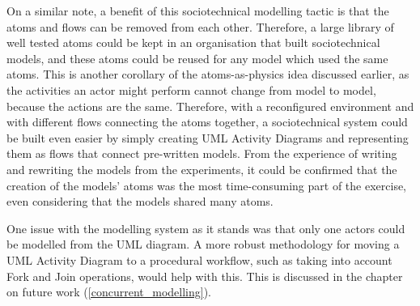 On a similar note, a benefit of this sociotechnical modelling tactic is that the atoms and flows can be removed from each other. Therefore, a large library of well tested atoms could be kept in an organisation that built sociotechnical models, and these atoms could be reused for any model which used the same atoms. This is another corollary of the atoms-as-physics idea discussed earlier, as the activities an actor might perform cannot change from model to model, because the actions are the same. Therefore, with a reconfigured environment and with different flows connecting the atoms together, a sociotechnical system could be built even easier by simply creating UML Activity Diagrams and representing them as flows that connect pre-written models. From the experience of writing and rewriting the models from the experiments, it could be confirmed that the creation of the models' atoms was the most time-consuming part of the exercise, even considering that the models shared many atoms. \par

One issue with the modelling system as it stands was that only one actors could be modelled from the UML diagram. A more robust methodology for moving a UML Activity Diagram to a procedural workflow, such as taking into account Fork and Join operations, would help with this. This is discussed in the chapter on future work (\cref{concurrent_modelling}). \par